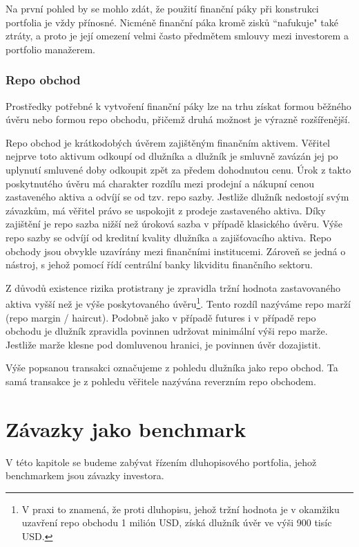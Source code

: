 \documentclass[a4paper]{book}
\begin{document}
Na první pohled by se mohlo zdát, že použití finanční páky při konstrukci portfolia je vždy přínosné. Nicméně finanční páka kromě zisků ``nafukuje" také ztráty, a proto je její omezení velmi často předmětem smlouvy mezi investorem a portfolio manažerem.

\subsubsection{Repo obchod}

Prostředky potřebné k vytvoření finanční páky lze na trhu získat formou běžného úvěru nebo formou repo obchodu, přičemž druhá možnost je výrazně rozšířenější.

Repo obchod je krátkodobých úvěrem zajištěným finančním aktivem. Věřitel nejprve toto aktivum odkoupí od dlužníka a dlužník je smluvně zavázán jej po uplynutí smluvené doby odkoupit zpět za předem dohodnutou cenu. Úrok z takto poskytnutého úvěru má charakter rozdílu mezi prodejní a nákupní cenou zastaveného aktiva a odvíjí se od tzv. repo sazby. Jestliže dlužník nedostojí svým závazkům, má věřitel právo se uspokojit z prodeje zastaveného aktiva. Díky zajištění je repo sazba nižší než úroková sazba v případě klasického úvěru. Výše repo sazby se odvíjí od kreditní kvality dlužníka a zajišťovacího aktiva. Repo obchody jsou obvykle uzavírány mezi finančními institucemi. Zároveň se jedná o nástroj, s jehož pomocí řídí centrální banky likviditu finančního sektoru.

Z důvodů existence rizika protistrany je zpravidla tržní hodnota zastavovaného aktiva vyšší než je výše poskytovaného úvěru\footnote{V praxi to znamená, že proti dluhopisu, jehož tržní hodnota je v okamžiku uzavření repo obchodu 1 milión USD, získá dlužník úvěr ve výši 900 tisíc USD.}. Tento rozdíl nazýváme repo marží (repo margin / haircut). Podobně jako v případě futures i v případě repo obchodu je dlužník zpravidla povinnen udržovat minimální výši repo marže. Jestliže marže klesne pod domluvenou hranici, je povinnen úvěr dozajistit.

Výše popsanou transakci označujeme z pohledu dlužníka jako repo obchod. Ta samá transakce je z pohledu věřitele nazývána reverzním repo obchodem.

\section{Závazky jako benchmark}

V této kapitole se budeme zabývat řízením dluhopisového portfolia, jehož benchmarkem jsou závazky investora.
\end{document}
